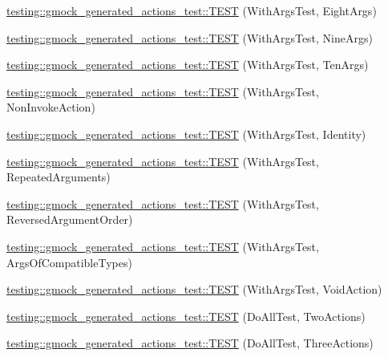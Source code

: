 \begin{DoxyCompactItemize}
\mbox{\hyperlink{namespacetesting_1_1gmock__generated__actions__test_a5cbb36915cb29391752600a2a0e9c7e1}{testing\+::gmock\+\_\+generated\+\_\+actions\+\_\+test\+::\+T\+E\+ST}} (With\+Args\+Test, Eight\+Args)
\item 
\mbox{\hyperlink{namespacetesting_1_1gmock__generated__actions__test_aee9acec4535339649dd3067f671cc6c1}{testing\+::gmock\+\_\+generated\+\_\+actions\+\_\+test\+::\+T\+E\+ST}} (With\+Args\+Test, Nine\+Args)
\item 
\mbox{\hyperlink{namespacetesting_1_1gmock__generated__actions__test_a6a818f5a6c2250d3944f90e4331ebc0e}{testing\+::gmock\+\_\+generated\+\_\+actions\+\_\+test\+::\+T\+E\+ST}} (With\+Args\+Test, Ten\+Args)
\item 
\mbox{\hyperlink{namespacetesting_1_1gmock__generated__actions__test_a5380c41df40cb159d58d4c4c81aeac19}{testing\+::gmock\+\_\+generated\+\_\+actions\+\_\+test\+::\+T\+E\+ST}} (With\+Args\+Test, Non\+Invoke\+Action)
\item 
\mbox{\hyperlink{namespacetesting_1_1gmock__generated__actions__test_a0499d0970300d8d6c252a898222b8dd3}{testing\+::gmock\+\_\+generated\+\_\+actions\+\_\+test\+::\+T\+E\+ST}} (With\+Args\+Test, Identity)
\item 
\mbox{\hyperlink{namespacetesting_1_1gmock__generated__actions__test_aea7114a30b1fc589d14e84f1a27bd1fb}{testing\+::gmock\+\_\+generated\+\_\+actions\+\_\+test\+::\+T\+E\+ST}} (With\+Args\+Test, Repeated\+Arguments)
\item 
\mbox{\hyperlink{namespacetesting_1_1gmock__generated__actions__test_a8a9dc47b8e9810ca74166a9d17cba54f}{testing\+::gmock\+\_\+generated\+\_\+actions\+\_\+test\+::\+T\+E\+ST}} (With\+Args\+Test, Reversed\+Argument\+Order)
\item 
\mbox{\hyperlink{namespacetesting_1_1gmock__generated__actions__test_a4330224375c915f21860c30798dacd0c}{testing\+::gmock\+\_\+generated\+\_\+actions\+\_\+test\+::\+T\+E\+ST}} (With\+Args\+Test, Args\+Of\+Compatible\+Types)
\item 
\mbox{\hyperlink{namespacetesting_1_1gmock__generated__actions__test_a744fd048a745e3df48a578ed251003c6}{testing\+::gmock\+\_\+generated\+\_\+actions\+\_\+test\+::\+T\+E\+ST}} (With\+Args\+Test, Void\+Action)
\item 
\mbox{\hyperlink{namespacetesting_1_1gmock__generated__actions__test_ab1820fa999561582ae20885c4149a634}{testing\+::gmock\+\_\+generated\+\_\+actions\+\_\+test\+::\+T\+E\+ST}} (Do\+All\+Test, Two\+Actions)
\item 
\mbox{\hyperlink{namespacetesting_1_1gmock__generated__actions__test_a9fe00b82e3daa39501cefb4636b1909c}{testing\+::gmock\+\_\+generated\+\_\+actions\+\_\+test\+::\+T\+E\+ST}} (Do\+All\+Test, Three\+Actions)

\end{DoxyCompactItemize}
